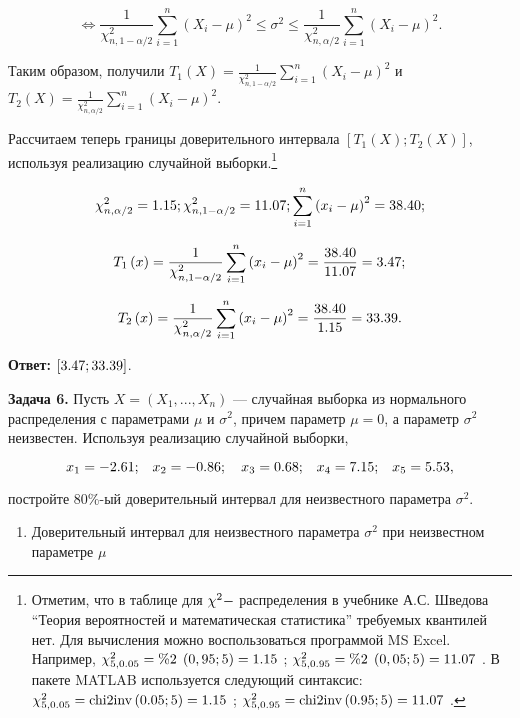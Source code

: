 \[\Leftrightarrow \frac{1}{\chi _{n,1-\alpha /2}^{2} } \sum _{i=1}^{n}\left(X_{i} -\mu \right)^{2}  \le \sigma ^{2} \le \frac{1}{\chi _{n,\alpha /2}^{2} } \sum _{i=1}^{n}\left(X_{i} -\mu \right)^{2}  .\] 

Таким образом, получили $T_{1} \left(X\right)=\frac{1}{\chi _{n,1-\alpha /2}^{2} } \sum _{i=1}^{n}\left(X_{i} -\mu \right)^{2}  $ и $T_{2} \left(X\right)=\frac{1}{\chi _{n,\alpha /2}^{2} } \sum _{i=1}^{n}\left(X_{i} -\mu \right)^{2}  $.

Рассчитаем теперь границы доверительного интервала $\left[T_{1} \left(X\right);T_{2} \left(X\right)\right]$, используя реализацию случайной выборки.\footnote{ Отметим, что в таблице для  $\chi ^{2} {\rm -}$ распределения в учебнике А.С. Шведова ``Теория вероятностей и математическая статистика'' требуемых квантилей нет. Для вычисления можно воспользоваться программой MS Excel. Например,  $\chi _{5,0.05}^{2} ={\rm \% 2\; }\left(0,95;5\right)=1.15$ ;  $\chi _{5,0.95}^{2} ={\rm \% 2\; }\left(0,05;5\right)=11.07$ .  В пакете MATLAB используется следующий синтаксис:  $\chi _{5,0.05}^{2} ={\rm chi2inv}\left(0.05;5\right)=1.15$ ;  $\chi _{5,0.95}^{2} ={\rm chi2inv}\left(0.95;5\right)=11.07$ .}

\[\chi _{n,\alpha /2}^{2} ={\rm 1.15}; \chi _{n,1-\alpha /2}^{2} ={\rm 11.07}; \sum _{i=1}^{n}\left(x_{i} -\mu \right)^{2}  ={\rm 38.40};\] 

\[T_{1} \left(x\right)=\frac{1}{\chi _{n,1-\alpha /2}^{2} } \sum _{i=1}^{n}\left(x_{i} -\mu \right)^{2}  =\frac{{\rm 38.40}}{{\rm 11.07}} ={\rm 3.47};\] 

\[T_{2} \left(x\right)=\frac{1}{\chi _{n,\alpha /2}^{2} } \sum _{i=1}^{n}\left(x_{i} -\mu \right)^{2}  =\frac{{\rm 38.40}}{{\rm 1.15}} ={\rm 33.39}.\] 

\textbf{Ответ:} $\left[{\rm 3.47};{\rm 33.39}\right]$.



\textbf{Задача 6.}  Пусть $X=\left(X_{1} ,...,X_{n} \right)$ --- случайная выборка из нормального распределения с параметрами $\mu $ и $\sigma ^{2} $, причем параметр $\mu =0$, а параметр $\sigma ^{2} $ неизвестен. Используя реализацию случайной выборки, 

\[x_{1} =-{\rm 2.61;}\quad x_{2} =-{\rm 0.86};\quad x_{3} ={\rm 0.68;}\quad x_{4} ={\rm 7.15;}\quad x_{5} ={\rm 5.53,}\] 

постройте 80\%-ый доверительный интервал для неизвестного параметра $\sigma ^{2} $.



\begin{enumerate}
\item  Доверительный интервал для неизвестного параметра $\sigma ^{2} $ при неизвестном параметре $\mu $ 
\end{enumerate}




